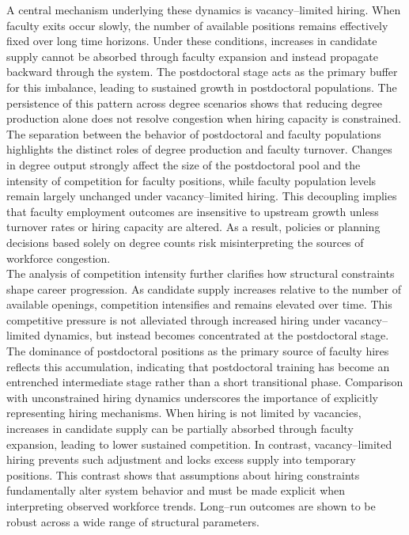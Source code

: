 \documentclass[3p]{elsarticle}%
\theoremstyle{definition}
\begin{document}
 \noindent A central mechanism underlying these dynamics is vacancy--limited hiring. When faculty exits occur slowly, the number of available positions remains effectively fixed over long time horizons. Under these conditions, increases in candidate supply cannot be absorbed through faculty expansion and instead propagate backward through the system. The postdoctoral stage acts as the primary buffer for this imbalance, leading to sustained growth in postdoctoral populations. The persistence of this pattern across degree scenarios shows that reducing degree production alone does not resolve congestion when hiring capacity is constrained. The separation between the behavior of postdoctoral and faculty populations highlights the distinct roles of degree production and faculty turnover. Changes in degree output strongly affect the size of the postdoctoral pool and the intensity of competition for faculty positions, while faculty population levels remain largely unchanged under vacancy--limited hiring. This decoupling implies that faculty employment outcomes are insensitive to upstream growth unless turnover rates or hiring capacity are altered. As a result, policies or planning decisions based solely on degree counts risk misinterpreting the sources of workforce congestion. \\
 
 \noindent The analysis of competition intensity further clarifies how structural constraints shape career progression. As candidate supply increases relative to the number of available openings, competition intensifies and remains elevated over time. This competitive pressure is not alleviated through increased hiring under vacancy--limited dynamics, but instead becomes concentrated at the postdoctoral stage. The dominance of postdoctoral positions as the primary source of faculty hires reflects this accumulation, indicating that postdoctoral training has become an entrenched intermediate stage rather than a short transitional phase. Comparison with unconstrained hiring dynamics underscores the importance of explicitly representing hiring mechanisms. When hiring is not limited by vacancies, increases in candidate supply can be partially absorbed through faculty expansion, leading to lower sustained competition. In contrast, vacancy--limited hiring prevents such adjustment and locks excess supply into temporary positions. This contrast shows that assumptions about hiring constraints fundamentally alter system behavior and must be made explicit when interpreting observed workforce trends. Long--run outcomes are shown to be robust across a wide range of structural parameters. \\
 
\end{document}
